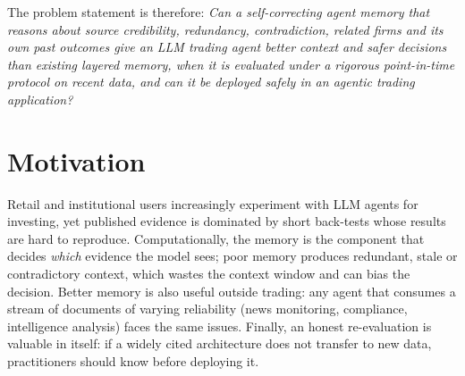 The problem statement is therefore: \emph{Can a self-correcting agent memory that reasons about source credibility, redundancy, contradiction, related firms and its own past outcomes give an LLM trading agent better context and safer decisions than existing layered memory, when it is evaluated under a rigorous point-in-time protocol on recent data, and can it be deployed safely in an agentic trading application?}

\section{Motivation}
Retail and institutional users increasingly experiment with LLM agents for investing, yet published evidence is dominated by short back-tests whose results are hard to reproduce. Computationally, the memory is the component that decides \emph{which} evidence the model sees; poor memory produces redundant, stale or contradictory context, which wastes the context window and can bias the decision. Better memory is also useful outside trading: any agent that consumes a stream of documents of varying reliability (news monitoring, compliance, intelligence analysis) faces the same issues. Finally, an honest re-evaluation is valuable in itself: if a widely cited architecture does not transfer to new data, practitioners should know before deploying it.

